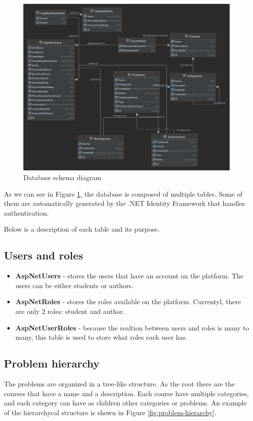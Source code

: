 \documentclass[12pt,a4paper]{report}
\begin{document}
\begin{figure}[h]
	\centering
	\includegraphics[width=\linewidth]{pics/database-schema.png}
	\caption{Database schema diagram}
	\label{fig:database-schema}
\end{figure}

As we can see in Figure \ref{fig:database-schema}, the database is composed of multiple tables. Some of them are automatically generated by the .NET Identity Framework that handles authentication.

Below is a description of each table and its purpose.

\newpage
\subsection{Users and roles}
\label{users-and-roles}
\begin{itemize}
	\item \textbf{AspNetUsers} - stores the users that have an account on the platform. The users can be either students or authors.
	\item \textbf{AspNetRoles} - stores the roles available on the platform. Currentyl, there are only 2 roles: student and author.
	\item \textbf{AspNetUserRoles} - because the realtion between users and roles is many to many, this table is used to store what roles each user has.
\end{itemize}

\subsection{Problem hierarchy}
The problems are organized in a tree-like structure. As the root there are the courses that have a name and a description. Each course have multiple categories, and each category can have as children other categories or problems. An example of the hierarchycal structure is shown in Figure \ref{fig:problem-hierarchy}.
\end{document}
